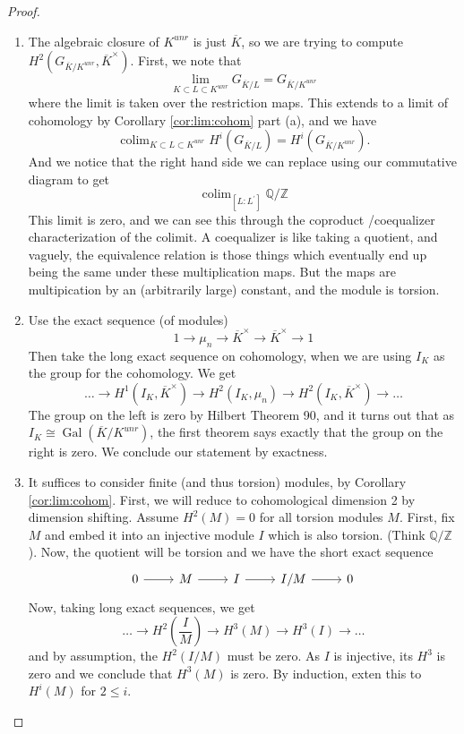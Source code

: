 \documentclass[a4paper]{article}
\newcommand{\isom}{\cong}
\newcommand{\ins}{\subset}
\newcommand{\cross}{\times}
\newcommand{\colim}{\operatorname{colim}}
\newcommand{\Gal}{\operatorname{Gal}}
\begin{document}
\begin{proof}
	\begin{enumerate}[(1)]
		\item The algebraic closure of \(K^{unr}\) is just \(\overline{K}\),
			so we are trying to compute 
			\(H^{2}(G_{\overline{K} / K^{unr}},\overline{K}^{\times})\).
			First, we note that
			 \[
			 \lim_{K \ins L \ins K^{unr}} G_{\overline{K} / L} 
			 = G_{\overline{K} / K^{unr}}
			 \] 
			where the limit is taken over the restriction maps.
			This extends to a limit of cohomology by 
			Corollary \ref{cor:lim:cohom} part (a), and
			we have
			\[
				\colim_{K \ins L \ins K^{unr}} H^{i}(G_{\overline{K} / L}) 
				= H^{i}(G_{\overline{K} / K^{unr}})
			.\] 
			And we notice that the right hand side we can replace using
			our commutative diagram to get
			\[
				\colim_{[L:L^{\prime}]} \mathbb{Q} / \mathbb{Z}
			\] 
			This limit is zero, and we can see this through the coproduct
			/coequalizer characterization of the colimit. 
			A coequalizer is like taking a quotient, and vaguely, the 
			equivalence relation is those things which eventually end up being
			the same under these multiplication maps. 
			But the maps are multipication by an (arbitrarily large) constant,
			and the module is torsion.
		\item Use the exact sequence (of modules) 
			\[
			1 \to \mu_{n} \to \overline{K}^{\cross} \to \overline{K}^{\cross}
			\to 1
			\] 
			Then take the long exact sequence on cohomology, when we are using
			\(I_{K}\) as the group for the cohomology.
			We get 
			\[
				\ldots \to H^{1}(I_{K},\overline{K}^{\cross}) \to
				H^{2}(I_{K}, \mu_{n}) \to H^{2}(I_{K},\overline{K}^{\cross})
				\to \ldots
			\] 
			The group on the left is zero by Hilbert Theorem 90, and
			it turns out that as \(I_{K} \isom \Gal\left( 
			\overline{K} / K^{unr} \right)\), the first theorem 
			says exactly that the group on the right is zero. 
			We conclude our statement by exactness.
			
		\item 
			It suffices to consider
			finite (and thus torsion) modules, by Corollary \ref{cor:lim:cohom}.
			First, we will reduce to cohomological dimension 2 by dimension
			shifting. 
			Assume \(H^{2}(M) = 0\) for all torsion modules \(M\).
			First, fix \(M\) and embed it into an injective module \(I\) 
			which is also torsion.
			(Think \(\mathbb{Q} / \mathbb{Z}\)).
			Now, the quotient will be torsion and we have the short exact sequence
			\[
			\begin{tikzcd}
			0 \arrow{r}{} & M \arrow{r}{} & 
			I \arrow{r}{} & I / M \arrow{r}{} & 0
			\end{tikzcd}
			\]
			Now, taking long exact sequences, we get
			\[
				\ldots \to H^{2}(\frac{I}{M}) \to 
				H^{3}(M) \to H^{3}(I) \to \ldots
			\] 
			and by assumption, the \(H^{2}(I / M)\) must be zero.
			As \(I\) is injective, its \(H^{3}\) is zero and we conclude
			that \(H^{3}(M)\) is zero. 
			By induction, exten this to \(H^{i}(M)\) for \(2 \leq i\).


\end{enumerate}
\end{proof}
\end{document}
